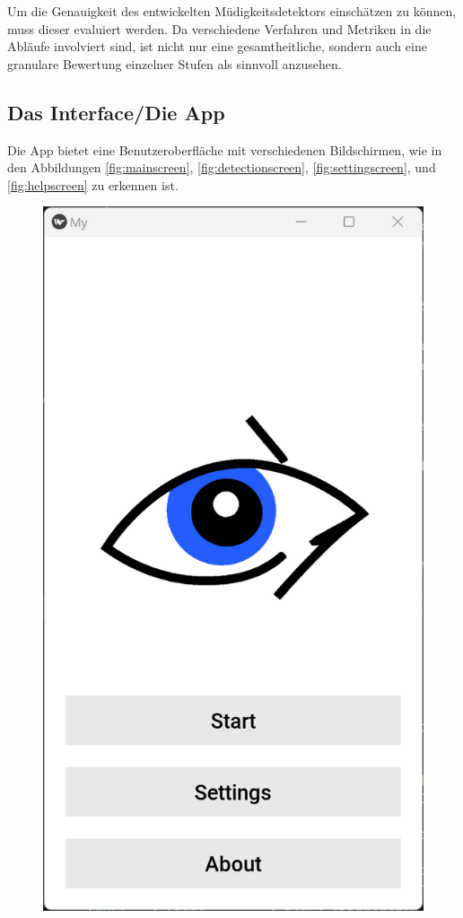 Um die Genauigkeit des entwickelten Müdigkeitsdetektors einschätzen zu können, muss dieser evaluiert werden. Da verschiedene Verfahren und Metriken in die Abläufe involviert sind, ist nicht nur eine gesamtheitliche, sondern auch eine granulare Bewertung einzelner Stufen als sinnvoll anzusehen. 

\subsection{Das Interface/Die App}
\label{ssec:interface}

Die App bietet eine Benutzeroberfläche mit verschiedenen Bildschirmen, wie in den Abbildungen \ref{fig:mainscreen}, \ref{fig:detectionscreen}, \ref{fig:settingscreen}, und \ref{fig:helpscreen} zu erkennen ist.

\begin{figure}[h]
	\centering
	\begin{minipage}[b]{0.22\textwidth}
		\includegraphics[width=\linewidth]{images/mainscreen.png}

\end{minipage}
\end{figure}
